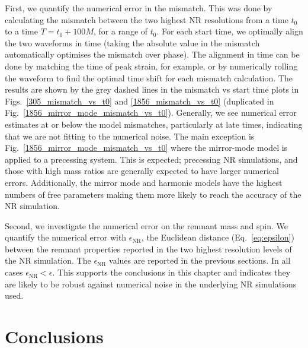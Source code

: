 First, we quantify the numerical error in the mismatch.
This was done by calculating the mismatch between the two highest NR resolutions from a time $t_0$ to a time $T = t_0 + 100M$, for a range of $t_0$. For each start time, we optimally align the two waveforms in time (taking the absolute value in the mismatch automatically optimises the mismatch over phase). The alignment in time can be done by matching the time of peak strain, for example, or by numerically rolling the waveform to find the optimal time shift for each mismatch calculation.
The results are shown by the grey dashed lines in the mismatch vs start time plots in Figs.~\ref{305_mismatch_vs_t0} and \ref{1856_mismatch_vs_t0} (duplicated in Fig.~\ref{1856_mirror_mode_mismatch_vs_t0}).
Generally, we see numerical error estimates at or below the model mismatches, particularly at late times, indicating that we are not fitting to the numerical noise.
The main exception is Fig.~\ref{1856_mirror_mode_mismatch_vs_t0} where the mirror-mode model is applied to a precessing system. This is expected; precessing NR simulations, and those with high mass ratios are generally expected to have larger numerical errors. Additionally, the mirror mode and harmonic models have the highest numbers of free parameters making them more likely to reach the accuracy of the NR simulation. 

Second, we investigate the numerical error on the remnant mass and spin.
We quantify the numerical error with $\epsilon_{\mathrm{NR}}$, the Euclidean distance (Eq.~\ref{eq:epsilon}) between the remnant properties reported in the two highest resolution levels of the NR simulation.
The $\epsilon_{\mathrm{NR}}$ values are reported in the previous sections.
In all cases $\epsilon_{\mathrm{NR}} < \epsilon$. 
This supports the conclusions in this chapter and indicates they are likely to be robust against numerical noise in the underlying NR simulations used.


\section{Conclusions} \label{sec:discussion}

